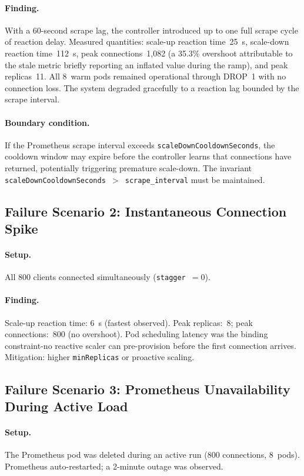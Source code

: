 \documentclass[3p,twocolumn]{elsarticle}
\theoremstyle{plain}%
\theoremstyle{definition}%
\begin{document}
\paragraph{Finding.} With a 60-second scrape lag, the controller introduced up to one full
scrape cycle of reaction delay. Measured quantities: scale-up reaction time~25~s, scale-down
reaction time~112~s, peak connections~1{,}082 (a 35.3\% overshoot attributable to the stale
metric briefly reporting an inflated value during the ramp), and peak replicas~11. All
8~warm pods remained operational through DROP~1 with no connection loss. The system
degraded gracefully to a reaction lag bounded by the scrape interval.

\paragraph{Boundary condition.} If the Prometheus scrape interval exceeds
\texttt{scaleDownCooldownSeconds}, the cooldown window may expire before the controller
learns that connections have returned, potentially triggering premature scale-down. The
invariant \texttt{scaleDownCooldownSeconds $>$ scrape\_interval} must be maintained.

\subsection{Failure Scenario 2: Instantaneous Connection Spike}

\paragraph{Setup.} All 800 clients connected simultaneously (\texttt{stagger}~$= 0$).

\paragraph{Finding.} Scale-up reaction time: 6~s (fastest observed). Peak replicas:~8; peak connections:~800 (no overshoot). Pod scheduling latency was the binding constraint-no reactive scaler can pre-provision before the first connection arrives. Mitigation: higher \texttt{minReplicas} or proactive scaling.

\subsection{Failure Scenario 3: Prometheus Unavailability During Active Load}

\paragraph{Setup.} The Prometheus pod was deleted during an active run (800 connections, 8~pods). Prometheus auto-restarted; a 2-minute outage was observed.
\end{document}
